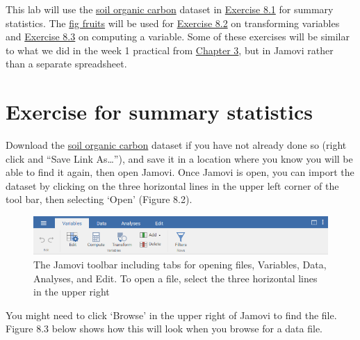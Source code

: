 \documentclass[
]{scrbook}
\begin{document}
This lab will use the \href{https://raw.githubusercontent.com/bradduthie/statistical_techniques/main/data/soil_organic_carbon.csv}{soil organic carbon} dataset in \protect\hyperlink{02_summary_statistics}{Exercise 8.1} for summary statistics.
The \href{https://raw.githubusercontent.com/bradduthie/statistical_techniques/main/data/fig_fruits.csv}{fig fruits} will be used for \protect\hyperlink{02_transforming_variables}{Exercise 8.2} on transforming variables and \protect\hyperlink{02_computing_variables}{Exercise 8.3} on computing a variable.
Some of these exercises will be similar to what we did in the week 1 practical from \protect\hyperlink{ux5cux23Chapter_3}{Chapter 3}, but in Jamovi rather than a separate spreadsheet.

\hypertarget{summary_statistics_02}{%
\section{Exercise for summary statistics}\label{summary_statistics_02}}

Download the \href{https://raw.githubusercontent.com/bradduthie/SCIU4T4/main/data/soil_organic_carbon.csv}{soil organic carbon} dataset if you have not already done so (right click and ``Save Link As\ldots{}''), and save it in a location where you know you will be able to find it again, then open Jamovi.
Once Jamovi is open, you can import the dataset by clicking on the three horizontal lines in the upper left corner of the tool bar, then selecting `Open' (Figure 8.2).

\begin{figure}
\includegraphics[width=1\linewidth]{img/jamovi_toolbar} \caption{The Jamovi toolbar including tabs for opening files, Variables, Data, Analyses, and Edit. To open a file, select the three horizontal lines in the upper right}\label{fig:unnamed-chunk-25}
\end{figure}

You might need to click `Browse' in the upper right of Jamovi to find the file.
Figure 8.3 below shows how this will look when you browse for a data file.
\end{document}
